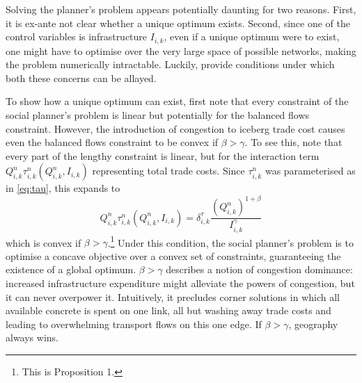 \documentclass[11pt, oneside]{article}   	%
\begin{document}
Solving the planner's problem appears potentially daunting for two reasons. First, it is ex-ante not clear whether a unique optimum exists. Second, since one of the control variables is infrastructure $I_{i,k}$, even if a unique optimum were to exist, one might have to optimise over the very large space of possible networks, making the problem numerically intractable. Luckily, \cite{fajgelbaum_optimal_2017} provide conditions under which both these concerns can be allayed.

To show how a unique optimum can exist, first note that every constraint of the social planner's problem is linear but potentially for the balanced flows constraint. However, the introduction of congestion to iceberg trade cost causes even the balanced flows constraint to be convex if $\beta > \gamma$. To see this, note that every part of the lengthy constraint is linear, but for the interaction term $Q_{i,k}^{n}\tau_{i,k}^{n}(Q_{i,k}^{n}, I_{i,k})$ representing total trade costs. Since $\tau_{i,k}^{n}$ was parameterised as in \eqref{eq:tau}, this expands to
\begin{equation}
  Q_{i,k}^{n}\tau_{i,k}^{n}(Q_{i,k}^{n}, I_{i,k}) = \delta^{\tau}_{i,k} \frac{(Q_{i,k}^{n})^{1+\beta}}{I_{i,k}^{\gamma}}
\end{equation}
which is convex if $\beta > \gamma$.\footnote{This is \citeauthor{fajgelbaum_optimal_2017} Proposition 1.} Under this condition, the social planner's problem is to optimise a concave objective over a convex set of constraints, guaranteeing the existence of a global optimum. $\beta > \gamma$ describes a notion of congestion dominance: increased infrastructure expenditure might alleviate the powers of congestion, but it can never overpower it. Intuitively, it precludes corner solutions in which all available concrete is spent on one link, all but washing away trade costs and leading to overwhelming transport flows on this one edge. If $\beta > \gamma$, geography always wins.
\end{document}
